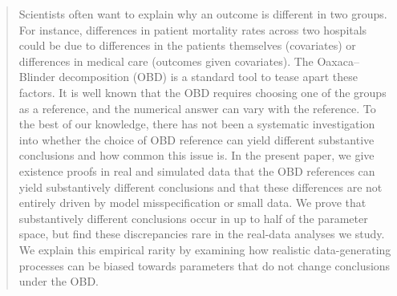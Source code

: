 \begin{abstract}
Scientists often want to explain why an outcome is different in two groups.
For instance, differences in patient mortality rates across two hospitals could be due to differences in the patients themselves (covariates) or differences in medical care (outcomes given covariates).
The Oaxaca--Blinder decomposition (OBD) is a standard tool to tease apart these factors.
It is well known that the OBD requires choosing one of the groups as a reference, and the numerical answer can vary with the reference.
To the best of our knowledge, there has not been a systematic investigation into whether the choice of OBD reference can yield different substantive conclusions and how common this issue is.
In the present paper, we give existence proofs in real and simulated data that the OBD references can yield substantively different conclusions and that these differences are not entirely driven by model misspecification or small data.
We prove that substantively different conclusions occur in up to half of the parameter space, but find these discrepancies rare in the real-data analyses we study.
We explain this empirical rarity by examining how realistic data-generating processes can be biased towards parameters that do not change conclusions under the OBD.
\end{abstract}
